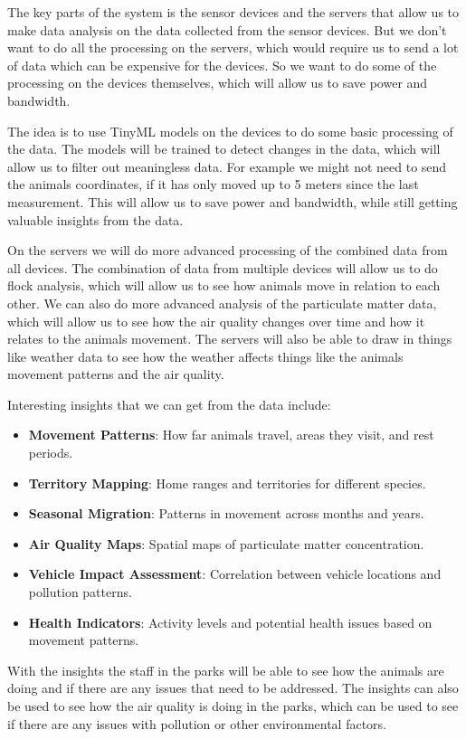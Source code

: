 The key parts of the system is the sensor devices and the servers that allow us to make data analysis on the data collected from the sensor devices. But we don't want to do all the processing on the servers, which would require us to send a lot of data which can be expensive for the devices. So we want to do some of the processing on the devices themselves, which will allow us to save power and bandwidth. 

The idea is to use TinyML models on the devices to do some basic processing of the data. The models will be trained to detect changes in the data, which will allow us to filter out meaningless data. For example we might not need to send the animals coordinates, if it has only moved up to 5 meters since the last measurement. This will allow us to save power and bandwidth, while still getting valuable insights from the data.

On the servers we will do more advanced processing of the combined data from all devices. The combination of data from multiple devices will allow us to do flock analysis, which will allow us to see how animals move in relation to each other. We can also do more advanced analysis of the particulate matter data, which will allow us to see how the air quality changes over time and how it relates to the animals movement.
The servers will also be able to draw in things like weather data to see how the weather affects things like the animals movement patterns and the air quality.

Interesting insights that we can get from the data include:

\begin{itemize}
  \item \textbf{Movement Patterns}: How far animals travel, areas they visit, and rest periods.
  \item \textbf{Territory Mapping}: Home ranges and territories for different species.
  \item \textbf{Seasonal Migration}: Patterns in movement across months and years.
  \item \textbf{Air Quality Maps}: Spatial maps of particulate matter concentration.
  \item \textbf{Vehicle Impact Assessment}: Correlation between vehicle locations and pollution patterns.
  \item \textbf{Health Indicators}: Activity levels and potential health issues based on movement patterns.
\end{itemize}

With the insights the staff in the parks will be able to see how the animals are doing and if there are any issues that need to be addressed. The insights can also be used to see how the air quality is doing in the parks, which can be used to see if there are any issues with pollution or other environmental factors.

